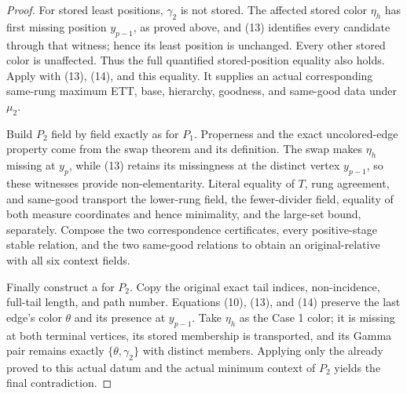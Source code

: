 \begin{proof}
For stored least positions, \(\gamma_2\) is not stored.  The affected
stored color \(\eta_h\) has first missing position \(y_{p-1}\), as proved
above, and (13) identifies every candidate through that witness; hence its
least position is unchanged.  Every other stored color is unaffected.
Thus the full quantified stored-position equality also holds.  Apply
 with (13), (14), and this
equality.  It supplies an actual corresponding same-rung maximum ETT,
base, hierarchy, goodness, and same-good data under \(\mu_2\).

Build \(P_2\) field by field exactly as for \(P_1\).  Properness and the
exact uncolored-edge property come from the swap theorem and its
definition.  The swap makes \(\eta_h\) missing at \(y_p\), while (13)
retains its missingness at the distinct vertex \(y_{p-1}\), so these
witnesses provide non-elementarity.  Literal equality of \(T\), rung
agreement, and same-good transport the lower-rung field, the
fewer-divider field, equality of both measure coordinates and hence
minimality, and the large-set bound, separately.  Compose the two
correspondence certificates, every positive-stage stable relation, and
the two same-good relations to obtain an original-relative
 with all six context fields.

Finally construct a  for
\(P_2\).  Copy the original exact tail indices, non-incidence, full-tail
length, and path number.  Equations (10), (13), and (14) preserve the last
edge's color \(\theta\) and its presence at \(y_{p-1}\).  Take
\(\eta_h\) as the Case 1 color; it is missing at both terminal vertices,
its stored membership is transported, and its Gamma pair remains exactly
\(\{\theta,\gamma_2\}\) with distinct members.  Applying only the already
proved  to this actual datum
and the actual minimum context of \(P_2\) yields the final contradiction.
\end{proof}

